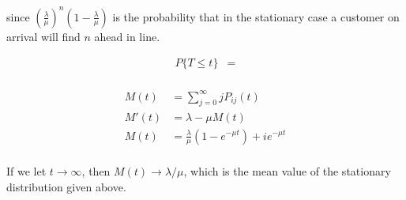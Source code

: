 \documentclass[12pt]{article}
\theoremstyle{nonumberbreak}
\begin{document}
since $(\frac{\lambda}{\mu})^n (1 - \frac{\lambda}{\mu})$ is the probability that in the stationary case a customer on arrival will find $n$ ahead in line. 


$$
\begin{aligned}
P \{ T \le t\} &= \\[8pt]
\end{aligned}
$$



$$
\begin{aligned}
M(t) &= \sum_{j=0}^\infty j P_{ij}(t) \\[8pt]
M'(t) &= \lambda - \mu M(t) \\[8pt]
M(t) &= \frac{\lambda}{\mu} (1 - e^{-\mu t}) + i e^{-\mu t} \\[8pt]
\end{aligned}
$$

If we let $t \to \infty$, then $M(t) \to \lambda/\mu$, which is the mean value of the stationary distribution given above. 
\end{document}
